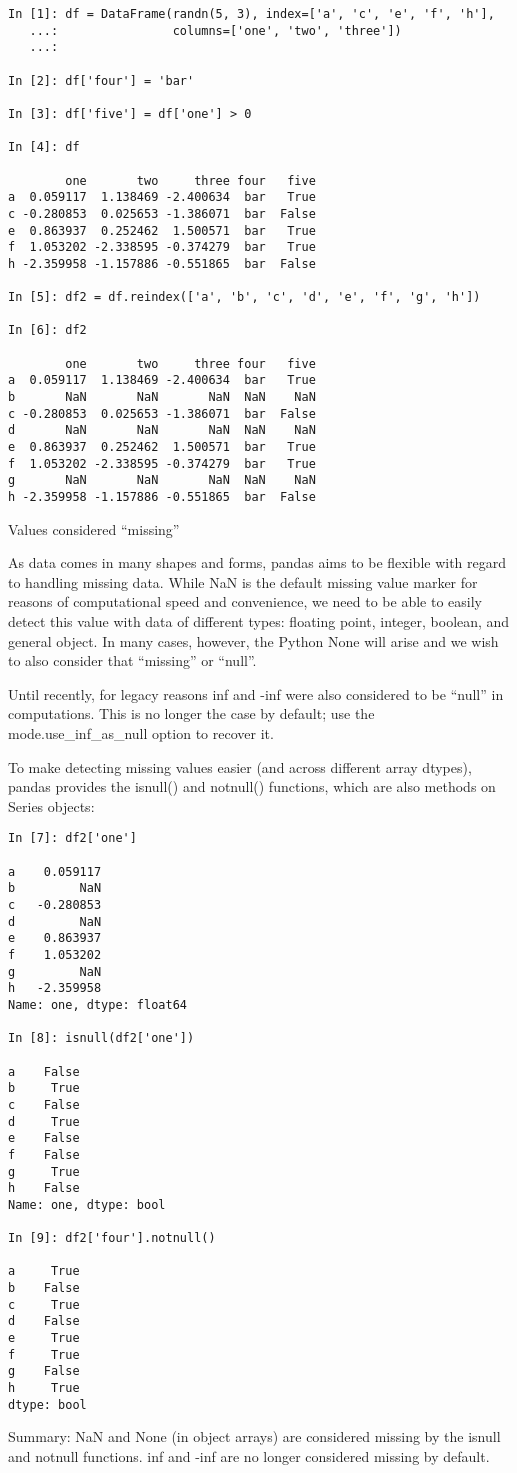 \documentclass[11pt]{article} %
\begin{document}
\begin{verbatim}
In [1]: df = DataFrame(randn(5, 3), index=['a', 'c', 'e', 'f', 'h'],
   ...:                columns=['one', 'two', 'three'])
   ...: 

In [2]: df['four'] = 'bar'

In [3]: df['five'] = df['one'] > 0

In [4]: df

        one       two     three four   five
a  0.059117  1.138469 -2.400634  bar   True
c -0.280853  0.025653 -1.386071  bar  False
e  0.863937  0.252462  1.500571  bar   True
f  1.053202 -2.338595 -0.374279  bar   True
h -2.359958 -1.157886 -0.551865  bar  False

In [5]: df2 = df.reindex(['a', 'b', 'c', 'd', 'e', 'f', 'g', 'h'])

In [6]: df2

        one       two     three four   five
a  0.059117  1.138469 -2.400634  bar   True
b       NaN       NaN       NaN  NaN    NaN
c -0.280853  0.025653 -1.386071  bar  False
d       NaN       NaN       NaN  NaN    NaN
e  0.863937  0.252462  1.500571  bar   True
f  1.053202 -2.338595 -0.374279  bar   True
g       NaN       NaN       NaN  NaN    NaN
h -2.359958 -1.157886 -0.551865  bar  False
\end{verbatim}
Values considered “missing”

As data comes in many shapes and forms, pandas aims to be flexible with regard to handling missing data. While NaN is the default missing value marker for reasons of computational speed and convenience, we need to be able to easily detect this value with data of different types: floating point, integer, boolean, and general object. In many cases, however, the Python None will arise and we wish to also consider that “missing” or “null”.

Until recently, for legacy reasons inf and -inf were also considered to be “null” in computations. This is no longer the case by default; use the mode.use_inf_as_null option to recover it.

To make detecting missing values easier (and across different array dtypes), pandas provides the isnull() and notnull() functions, which are also methods on Series objects:

\begin{verbatim}
In [7]: df2['one']

a    0.059117
b         NaN
c   -0.280853
d         NaN
e    0.863937
f    1.053202
g         NaN
h   -2.359958
Name: one, dtype: float64

In [8]: isnull(df2['one'])

a    False
b     True
c    False
d     True
e    False
f    False
g     True
h    False
Name: one, dtype: bool

In [9]: df2['four'].notnull()

a     True
b    False
c     True
d    False
e     True
f     True
g    False
h     True
dtype: bool
\end{verbatim}
Summary: NaN and None (in object arrays) are considered missing by the isnull and notnull functions. inf and -inf are no longer considered missing by default.
\newpage
\end{document}
